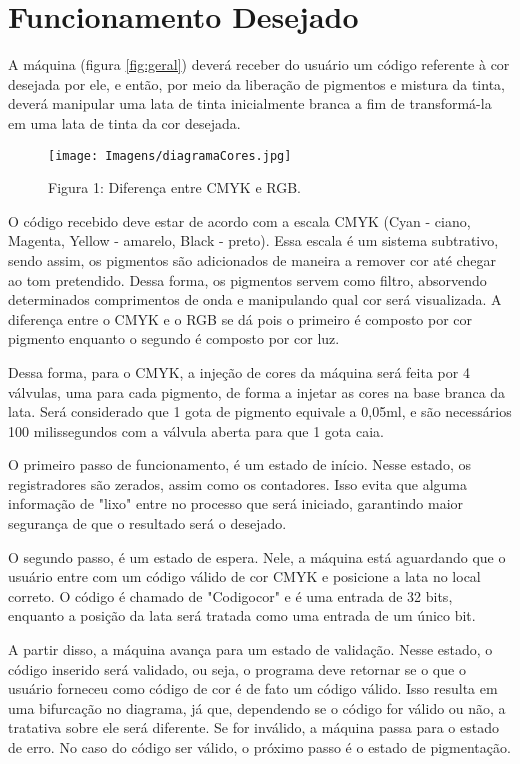 \documentclass[12pt,a4paper,oneside]{abntex2}
\begin{document}
        \section{Funcionamento Desejado}
            A máquina (figura \ref{fig:geral}) deverá receber do usuário um código referente à cor desejada por ele, e então, por meio da liberação de pigmentos e mistura da tinta, deverá manipular uma lata de tinta inicialmente branca a fim de transformá-la em uma lata de tinta da cor desejada. \par
            \begin{figure}[h]
                \centering
                \texttt{[image: Imagens/diagramaCores.jpg]}
                \caption{Figura 1: Diferença entre CMYK e RGB.}
                \label{fig:cores}
            \end{figure}
            O código recebido deve estar de acordo com a escala CMYK (Cyan - ciano, Magenta, Yellow - amarelo, Black - preto). Essa escala é um sistema subtrativo, sendo assim, os pigmentos são adicionados de maneira a remover cor até chegar ao tom pretendido. Dessa forma, os pigmentos servem como filtro, absorvendo determinados comprimentos de onda e manipulando qual cor será visualizada. A diferença entre o CMYK e o RGB se dá pois o primeiro é composto por cor pigmento enquanto o segundo é composto por cor luz.\par
            Dessa forma, para o CMYK, a injeção de cores da máquina será feita por 4 válvulas, uma para cada pigmento, de forma a injetar as cores na base branca da lata. Será considerado que 1 gota de pigmento equivale a 0,05ml, e são necessários 100 milissegundos com a válvula aberta para que 1 gota caia.\par
            O primeiro passo de funcionamento, é um estado de início. Nesse estado, os registradores são zerados, assim como os contadores. Isso evita que alguma informação de "lixo" entre no processo que será iniciado, garantindo maior segurança de que o resultado será o desejado.\par
            O segundo passo, é um estado de espera. Nele, a máquina está aguardando que o usuário entre com um código válido de cor CMYK e posicione a lata no local correto. O código é chamado de "Codigo\textunderscore cor" e é uma entrada de 32 bits, enquanto a posição da lata será tratada como uma entrada de um único bit.\par
            A partir disso, a máquina avança para um estado de validação. Nesse estado, o código inserido será validado, ou seja, o programa deve retornar se o que o usuário forneceu como código de cor é de fato um código válido. Isso resulta em uma bifurcação no diagrama, já que, dependendo se o código for válido ou não, a tratativa sobre ele será diferente. Se for inválido, a máquina passa para o estado de erro. No caso do código ser válido, o próximo passo é o estado de pigmentação.\par
\end{document}
